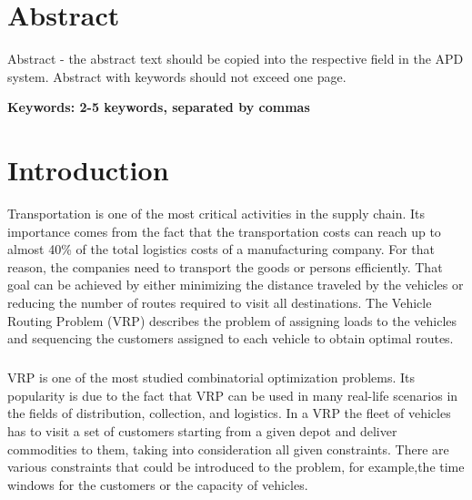 \documentclass[a4paper,twoside,12pt]{book}
\newcounter{PagesWithoutNumbers}
\begin{document}
\pagestyle{onlyPageNumbers}
\tableofcontents

\setcounter{PagesWithoutNumbers}{\value{page}}
\mainmatter
\pagestyle{empty}

\chapter*{Abstract}

Abstract - the abstract text should be copied into the respective field in the APD system. Abstract with keywords should not exceed one page.

\bf{Keywords:} 2-5 keywords, separated by commas


\cleardoublepage


\pagestyle{PageNumbersChapterTitles}



\chapter{Introduction}

 Transportation is one of the most critical activities in the supply chain. Its importance comes from the fact that the transportation costs can reach up to almost 40\% of the total logistics costs of a manufacturing company. \cite{bib:article:sukiennik} For that reason, the companies need to transport the goods or persons efficiently. That goal can be achieved by either minimizing the distance traveled by the vehicles or reducing the number of routes required to visit all destinations. The Vehicle Routing Problem (VRP) describes the problem of assigning loads to the vehicles and sequencing the customers assigned to each vehicle to obtain optimal routes.
\paragraph{}
VRP is one of the most studied combinatorial optimization problems. Its popularity is due to the fact that VRP can be used in many real-life scenarios in the fields of distribution, collection, and logistics.
In a VRP the fleet of vehicles has to visit a set of customers starting from a given depot and deliver commodities to them, taking into consideration all given constraints. There are various constraints that could be introduced to the problem, for example,the time windows for the customers or the capacity of vehicles.
\end{document}
